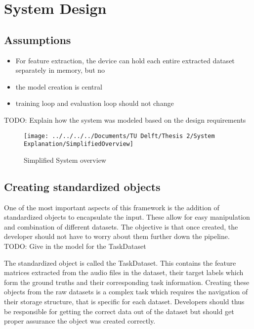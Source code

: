 \chapter{System Design}



\section{Assumptions}

\begin{itemize}
	\item For feature extraction, the device can hold each entire extracted dataset separately in memory, but no 
	\item the model creation is central
	\item training loop and evaluation loop should not change
\end{itemize}


TODO: Explain how the system was modeled based on the design requirements

\begin{figure}[h]
	\centering
	\texttt{[image: ../../../../Documents/TU Delft/Thesis 2/System Explanation/SimplifiedOverview]}
	\caption{Simplified System overview}
\end{figure}

\section{Creating standardized objects}

One of the most important aspects of this framework is the addition of standardized objects to encapsulate the input. These allow for easy manipulation and combination of different datasets. The objective is that once created, the developer should not have to worry about them further down the pipeline. \\

TODO: Give in the model for the TaskDataset

The standardized object is called the TaskDataset. This contains the feature matrices extracted from the audio files in the dataset, their target labels which form the ground truths and their corresponding task information. Creating these objects from the raw datasets is a complex task which requires the navigation of their storage structure, that is specific for each dataset. Developers should thus be responsible for getting the correct data out of the dataset but should get proper assurance the object was created correctly. \\


